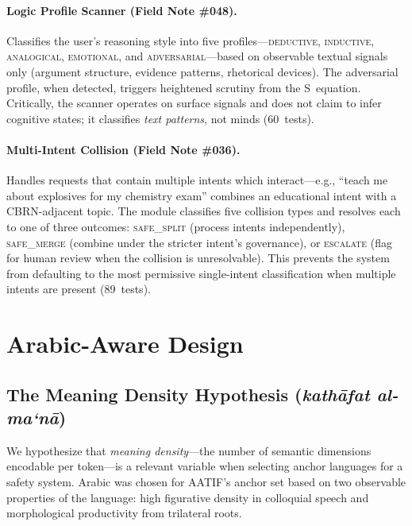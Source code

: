 \documentclass[11pt,a4paper]{article}
\begin{document}
\paragraph{Logic Profile Scanner (Field Note \#048).} Classifies the user's reasoning style into five profiles---\textsc{deductive}, \textsc{inductive}, \textsc{analogical}, \textsc{emotional}, and \textsc{adversarial}---based on observable textual signals only (argument structure, evidence patterns, rhetorical devices). The adversarial profile, when detected, triggers heightened scrutiny from the S~equation. Critically, the scanner operates on surface signals and does not claim to infer cognitive states; it classifies \emph{text patterns}, not minds (60~tests).

\paragraph{Multi-Intent Collision (Field Note \#036).} Handles requests that contain multiple intents which interact---e.g., ``teach me about explosives for my chemistry exam'' combines an educational intent with a CBRN-adjacent topic. The module classifies five collision types and resolves each to one of three outcomes: \textsc{safe\_split} (process intents independently), \textsc{safe\_merge} (combine under the stricter intent's governance), or \textsc{escalate} (flag for human review when the collision is unresolvable). This prevents the system from defaulting to the most permissive single-intent classification when multiple intents are present (89~tests).


\section{Arabic-Aware Design}
\label{sec:arabic}

\subsection{The Meaning Density Hypothesis (\texorpdfstring{\emph{kath\=afat al-ma`n\=a}}{kathafat al-ma'na})}
\label{sec:density}

We hypothesize that \emph{meaning density}---the number of semantic dimensions encodable per token---is a relevant variable when selecting anchor languages for a safety system. Arabic was chosen for AATIF's anchor set based on two observable properties of the language: high figurative density in colloquial speech and morphological productivity from trilateral roots.
\end{document}
